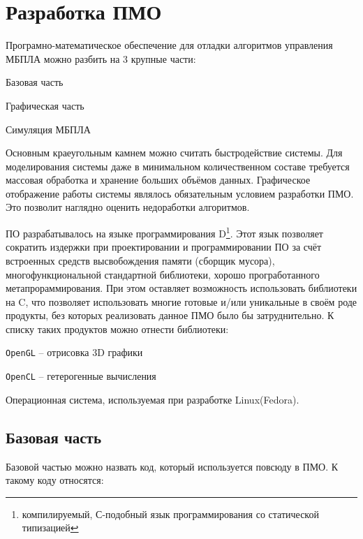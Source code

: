 \section{Разработка ПМО}

Програмно-математическое обеспечение для отладки алгоритмов управления
\linebreak МБПЛА можно разбить на 3 крупные части:

\begin{mintemize}
\item Базовая часть
\item Графическая часть
\item Симуляция МБПЛА
\end{mintemize}

Основным краеугольным камнем можно считать быстродействие системы.
Для моделирования системы даже в минимальном количественном составе
требуется массовая обработка и хранение больших объёмов данных. Графическое
отображение работы системы являлось обязательным условием разработки ПМО.
Это позволит наглядно оценить недоработки алгоритмов.

ПО разрабатывалось на языке программирования D\footnote{компилируемый, С-подобный
язык программирования со статической типизацией}. Этот язык позволяет сократить
издержки при проектировании и программировании ПО за счёт встроенных средств
высвобождения памяти (сборщик мусора), многофункциональной стандартной
библиотеки, хорошо програботанного метапрораммирования. При этом оставляет
возможность использовать библиотеки на C, что позволяет использовать
многие готовые и/или уникальные в своём роде продукты, без которых
реализовать данное ПМО было бы затруднительно. К списку таких продуктов
можно отнести библиотеки:

\begin{mintemize}
\item \verb|OpenGL| -- отрисовка 3D графики
\item \verb|OpenCL| -- гетерогенные вычисления
\end{mintemize}

Операционная система, используемая при разработке Linux(Fedora).

\newpage
\subsection{Базовая часть}

Базовой частью можно назвать код, который используется повсюду в ПМО.
К такому коду относятся:

